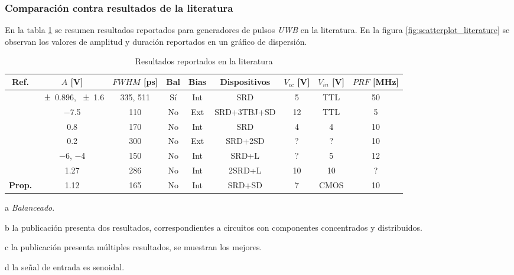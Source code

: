 \subsubsection{Comparación contra resultados de la literatura}

En la tabla \ref{tab:resultados_literatura} se resumen resultados reportados
para generadores de pulsos \textit{UWB} en la literatura. En la figura
\ref{fig:scatterplot_literature} se observan los valores de amplitud y duración
reportados en un gráfico de dispersión.

\begin{table}[t!]
    \begin{threeparttable}[b]
        {\footnotesize
            \begin{tabular}{ccccccccc}
                \hline
                Ref. & $A$ [\unit{\volt}] & $FWHM$ [\unit{\pico\second}] &
                Bal \tnote{a} & Bias & Dispositivos & $V_{cc}$ [\unit{\volt}] & $V_{in}$ [\unit{\volt}] & $PRF$ [\unit{\mega\hertz}] \\
                \hline
                \cite{rulikowski2004} & \num{\pm 0.896}, \num{\pm 1.6} \tnote{b} & 335, 511 & Sí & Int & SRD & 5 & TTL & 50 \\
                \cite{protiva2009} & \num{-7.5} & 110 & No & Ext & SRD+3TBJ+SD & 12 & TTL & 5 \\
                \cite{kamal2014} & \num{0.8} & 170 & No & Int & SRD & 4 & 4 & 10 \\
                \cite{han2002} & \num{0.2} & 300 & No & Ext & SRD+2SD & ? & ? & 10 \\
                \cite{han2005} & \num{-6}, \num{-4} & 150 & No & Int & SRD+L & ? & 5 & 12 \\
                \cite{oloumi2018} & \num{1.27} \tnote{c} & 286 & No & Int & 2SRD+L & 10 & 10 \tnote{d} & ? \\
                \textbf{Prop.} & \num{1.12} & 165 & No & Int & SRD+SD & 7 & CMOS  &
                \num{10} \\
            \end{tabular}
        }
        \begin{tablenotes}
            \item [a] \textit{Balanceado}.
            \item [b] la publicación presenta dos resultados, correspondientes a
            circuitos con componentes concentrados y distribuidos.
            \item [c] la publicación presenta múltiples resultados, se muestran
            los mejores.
            \item [d] la señal de entrada es senoidal.
        \end{tablenotes}
    \end{threeparttable}
    \caption{Resultados reportados en la literatura}
    \label{tab:resultados_literatura}
\end{table}

